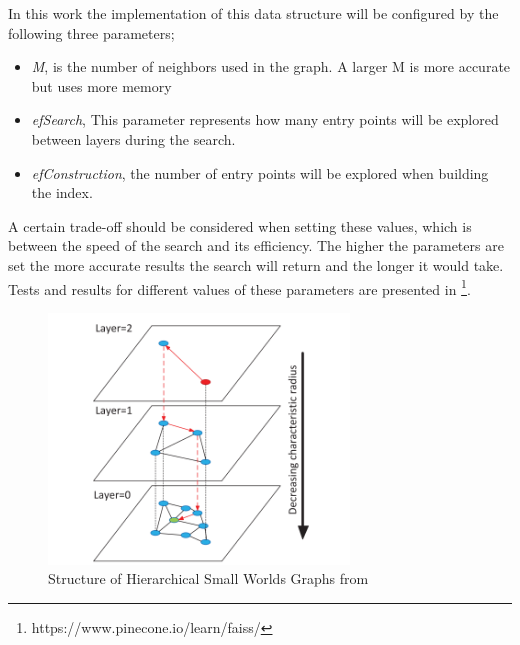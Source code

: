 In this work the implementation of this data structure will be configured by the following three parameters;
\begin{itemize}
\item{\textit{M}, is the number of neighbors used in the graph. A larger M is more accurate but uses more memory}
\item{\textit{efSearch}, This parameter represents how many entry points will be explored between layers during the search.}
\item{\textit{efConstruction}, the number of entry points will be explored when building the index.}
\end{itemize}
A certain trade-off should be considered when setting these values, which is between the speed of the search and its efficiency. The higher the parameters are set the more accurate results the search will return and the longer it would take. Tests and results for different values of these parameters are presented in \footnote{https://www.pinecone.io/learn/faiss/}.

\begin{figure}[t!]
\centering
\includegraphics[width=8cm]{figures/HNSWG.png}
\caption{Structure of Hierarchical Small Worlds Graphs from \cite{HNSWG}}
\label{HNSWG}
\end{figure}





